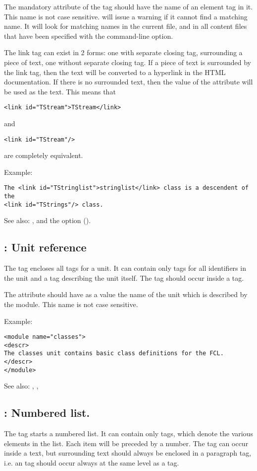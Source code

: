 The mandatory  attribute of the  tag should have the 
name of an element tag in it. This name is not case sensitive. \fpdoc
will issue a warning if it cannot find a matching name. It will look for
matching names in the current file, and in all content files that have been
specified with the  command-line option.

The link tag can exist in 2 forms: one with separate closing tag,
surrounding a piece of text, one without separate closing tag. If a piece of
text is surrounded by the link tag, then the text will be converted to a
hyperlink in the HTML documentation. If there is no surrounded text, then
the value of the  attribute will be used as the text. This means
that
\begin{verbatim}
<link id="TStream">TStream</link>
\end{verbatim}
and
\begin{verbatim}
<link id="TStream"/>
\end{verbatim}
are completely equivalent.

Example:
\begin{verbatim}
The <link id="TStringlist">stringlist</link> class is a descendent of the
<link id="TStrings"/> class.
\end{verbatim}

See also: ,  and the  option ().

\subsection{ : Unit reference}
\label{tag:module}
The  tag encloses all  tags for a unit. It can
contain only  tags for all identifiers in the unit and 
a  tag describing the unit itself. The  tag should
occur inside a  tag.

The  attribute should have as a value the name of the unit which
is described by the module. This name is not case sensitive.

Example:
\begin{verbatim}
<module name="classes">
<descr>
The classes unit contains basic class definitions for the FCL.
</descr>
</module>
\end{verbatim}

See also: , , 

\subsection{ : Numbered list.}
\label{tag:ol}
The  tag starts a numbered list. It can contain only 
tags, which denote the various elements in the list. Each item will be
preceded by a number. The  tag can
occur inside a text, but surrounding text should always be enclosed in a
 paragraph tag, i.e. an  tag should occur always at the
same level as a  tag.


